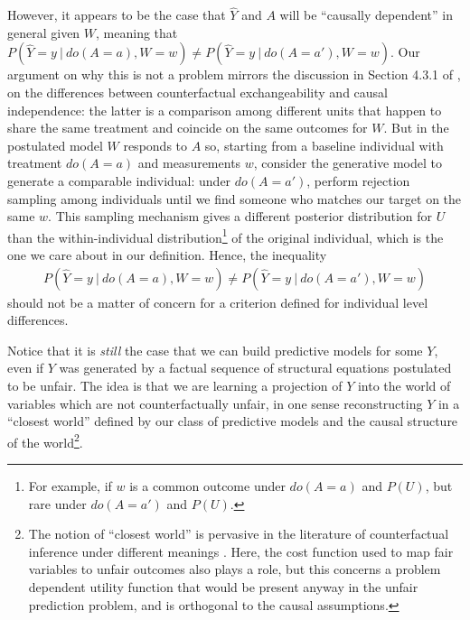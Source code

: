 However, it appears to be the case that $\hat Y$ and $A$ will be
``causally dependent'' in general given $W$, meaning that $P(\hat Y =
y\ |\ do(A = a), W = w) \neq P(\hat Y = y\ |\ do(A = a'), W = w)$.
Our argument on why this is not a problem mirrors the discussion in
Section 4.3.1 of \cite{pearl:16}, on the differences between
counterfactual exchangeability and causal independence: the latter is
a comparison among different units that happen to share the same
treatment and coincide on the same outcomes for $W$. But in the
postulated model $W$ responds to $A$ so, starting from a baseline
individual with treatment $do(A = a)$ and measurements $w$, consider
the generative model to generate a comparable individual: under $do(A
= a')$, perform rejection sampling among individuals until we find
someone who matches our target on the same $w$. This sampling
mechanism gives a different posterior distribution for $U$ than the
within-individual distribution\footnote{For example, if $w$ is a
  common outcome under $do(A = a)$ and $P(U)$, but rare under $do(A =
  a')$ and $P(U)$.} of the original individual, which is the one we care about in our
definition. Hence, the inequality
\begin{align}
  P(\hat Y = y\ |\ do(A = a), W = w)
  \neq P(\hat Y = y\ |\ do(A = a'), W = w)
\end{align}
should not be a matter of
concern for a criterion defined for individual level differences.

Notice that it is {\it still} the case that we can build predictive
models for some $Y$, even if $Y$ was generated by a factual sequence
of structural equations postulated to be unfair.  The idea is that we
are learning a projection of $Y$ into the world of variables which are
not counterfactually unfair, in one sense reconstructing $Y$ in a
``closest world'' defined by our class of predictive models and the
causal structure of the world\footnote{The notion of ``closest world''
  is pervasive in the literature of counterfactual inference under
  different meanings \citep{pearl:00, halpern:16}.  Here, the cost
  function used to map fair variables to unfair outcomes also plays a
  role, but this concerns a problem dependent utility function that
  would be present anyway in the unfair prediction problem, and is
  orthogonal to the causal assumptions.}.






